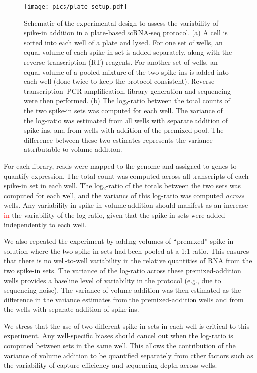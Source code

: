 \documentclass{article}
\newcommand{\revised}[1]{\textcolor{red}{#1}}
\begin{document}
\begin{figure}[tbp]
\begin{center}
\texttt{[image: pics/plate\_setup.pdf]}
\end{center}
\caption{Schematic of the experimental design to assess the variability of spike-in addition in a plate-based scRNA-seq protocol.
(a) A cell is sorted into each well of a plate and lysed.
For one set of wells, an equal volume of each spike-in set is added separately, along with the reverse transcription (RT) reagents.
For another set of wells, an equal volume of a pooled mixture of the two spike-ins is added into each well (done twice to keep the protocol consistent).
Reverse transcription, PCR amplification, library generation and sequencing were then performed.
(b) The log$_2$-ratio between the total counts of the two spike-in sets was computed for each well.
The variance of the log-ratio was estimated from all wells with separate addition of spike-ins, and from wells with addition of the premixed pool.
The difference between these two estimates represents the variance attributable to volume addition.
}
\label{fig:expdesign}
\end{figure}

For each library, reads were mapped to the genome and assigned to genes to quantify expression.
The total count was computed across all transcripts of each spike-in set in each well.
The log$_2$-ratio of the totals between the two sets was computed for each well, and the variance of this log-ratio was computed \textit{across} wells.
Any variability in spike-in volume addition should manifest as an increase \revised{in} the variability of the log-ratio, given that the spike-in sets were added independently to each well.

We also repeated the experiment by adding volumes of ``premixed'' spike-in solution where the two spike-in sets had been pooled at a 1:1 ratio.
This ensures that there is no well-to-well variability in the relative quantities of RNA from the two spike-in sets.
The variance of the log-ratio across these premixed-addition wells provides a baseline level of variability in the protocol (e.g., due to sequencing noise).
The variance of volume addition was then estimated as the difference in the variance estimates from the premixed-addition wells and from the wells with separate addition of spike-ins.

We stress that the use of two different spike-in sets in each well is critical to this experiment.
Any well-specific biases should cancel out when the log-ratio is computed between sets in the same well.
This allows the contribution of the variance of volume addition to be quantified separately from other factors such as the variability of capture efficiency and sequencing depth across wells.
\end{document}
